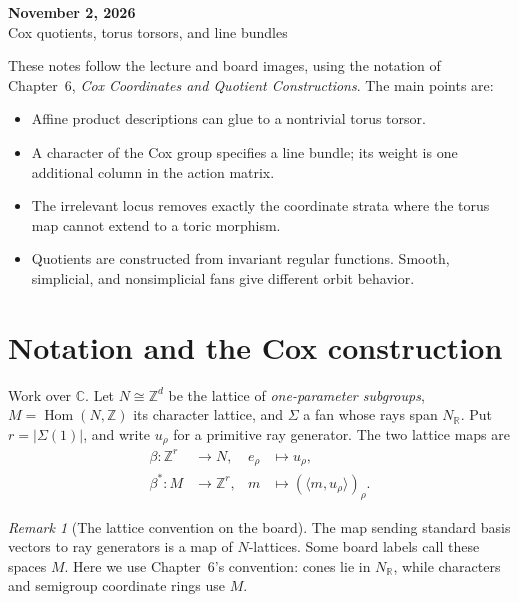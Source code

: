 \documentclass[11pt]{article}
\theoremstyle{definition}
\theoremstyle{remark}
\newtheorem{Rmk}{Remark}
\DeclareMathOperator{\Hom}{Hom}
\newcommand{\C}{\mathbb C}
\newcommand{\Z}{\mathbb Z}
\newcommand{\R}{\mathbb R}
\begin{document}
\begin{center}
  {\Large\bfseries November 2, 2026}\\[4pt]
  {\large Cox quotients, torus torsors, and line bundles}
\end{center}

These notes follow the lecture and board images, using the notation
of Chapter~6, \emph{Cox Coordinates and Quotient Constructions}.
The main points are:
\begin{itemize}
\item Affine product descriptions can glue to a nontrivial torus torsor.
\item A character of the Cox group specifies a line bundle; its weight
      is one additional column in the action matrix.
\item The irrelevant locus removes exactly the coordinate strata
      where the torus map cannot extend to a toric morphism.
\item Quotients are constructed from invariant regular functions.
      Smooth, simplicial, and nonsimplicial fans give different orbit behavior.
\end{itemize}

\section{Notation and the Cox construction}

Work over \(\C\). Let \(N\cong\Z^d\) be the lattice of
\emph{one-parameter subgroups}, \(M=\Hom(N,\Z)\) its character
lattice, and \(\Sigma\) a fan whose rays span \(N_\R\). Put
\(r=|\Sigma(1)|\), and write \(u_\rho\) for a primitive ray generator.
The two lattice maps are
\[
\begin{aligned}
\beta:\Z^r&\longrightarrow N,&e_\rho&\longmapsto u_\rho,\\
\beta^*:M&\longrightarrow\Z^r,&m&\longmapsto
       (\langle m,u_\rho\rangle)_\rho.
\end{aligned}
\]
\begin{Rmk}[The lattice convention on the board]
The map sending standard basis vectors to ray generators is a map
of \(N\)-lattices. Some board labels call these spaces \(M\).
Here we use Chapter~6's convention: cones lie in \(N_\R\), while
characters and semigroup coordinate rings use \(M\).
\end{Rmk}
\end{document}
